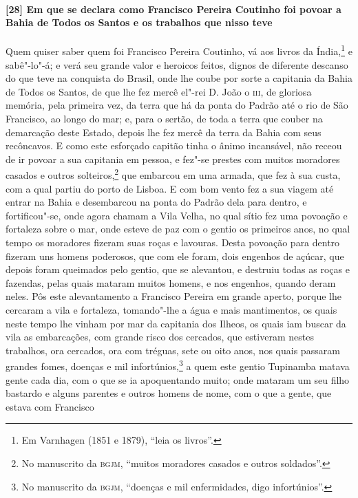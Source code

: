 \paragraph{[28] Em que se declara como Francisco Pereira Coutinho foi povoar a Bahia de
Todos os Santos e os trabalhos que nisso teve} \quad
Quem quiser saber quem foi Francisco Pereira Coutinho, vá aos livros da Índia,\footnote{
Em Varnhagen (1851 e 1879), ``leia os livros''.} e sabê"-lo"-á; e verá seu grande valor e
heroicos feitos, dignos de diferente descanso do que teve na conquista do Brasil, onde lhe
coube por sorte a capitania da Bahia de Todos os Santos, de que lhe fez mercê el"-rei D.
João o \textsc{iii}, de gloriosa memória, pela primeira vez, da terra que há da ponta do
Padrão até o rio de São Francisco, ao longo do mar; e, para o sertão, de toda a terra que
couber na demarcação deste Estado, depois lhe fez mercê da terra da Bahia com seus
recôncavos. E como este esforçado capitão tinha o ânimo incansável, não receou de ir
povoar a sua capitania em pessoa, e fez"-se prestes com muitos moradores casados e outros
solteiros,\footnote{ No manuscrito da \textsc{bgjm}, ``muitos moradores casados e outros
soldados''.} que embarcou em uma armada, que fez à sua custa, com a qual partiu do porto
de Lisboa. E com bom vento fez a sua viagem até entrar na Bahia e desembarcou na ponta do
Padrão dela para dentro, e fortificou"-se, onde agora chamam a Vila Velha, no qual sítio
fez uma povoação e fortaleza sobre o mar, onde esteve de paz com o gentio os primeiros
anos, no qual tempo os moradores fizeram suas roças e lavouras. Desta povoação para dentro
fizeram uns homens poderosos, que com ele foram, dois engenhos de açúcar, que depois foram
queimados pelo gentio, que se alevantou, e destruiu todas as roças e fazendas, pelas quais
mataram muitos homens, e nos engenhos, quando deram neles. Pôs este alevantamento a
Francisco Pereira em grande aperto, porque lhe cercaram a vila e fortaleza, tomando"-lhe a
água e mais mantimentos, os quais neste tempo lhe vinham por mar da capitania dos Ilheos,
os quais iam buscar da vila as embarcações, com grande risco dos cercados, que estiveram
nestes trabalhos, ora cercados, ora com tréguas, sete ou oito anos, nos quais passaram
grandes fomes, doenças e mil infortúnios,\footnote{ No manuscrito da \textsc{bgjm},
``doenças e mil enfermidades, digo infortúnios''.} a quem este gentio Tupinamba matava
gente cada dia, com o que se ia apoquentando muito; onde mataram um seu filho bastardo e
alguns parentes e outros homens de nome, com o que a gente, que estava com Francisco

